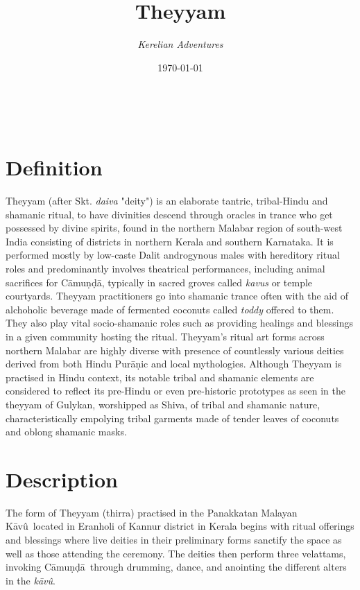 \documentclass[a4paper, 11pt]{article} %
\title{\textbf{Theyyam}} %
\author{\textit{Kerelian Adventures}} %
\date{\today} %
\makeatletter
\newcommand{\camunda}[0]{C\={a}mu\d{n}\d{d}\={a}}
\newcommand{\kavu}[0]{\textit{k\={a}v\^{u}}}
\newcommand{\Kavu}[0]{K\={a}v\^{u}}
\renewcommand{\maketitle}{ %
\begin{flushright} %
{\LARGE\@title} %

\vspace{10pt} %

{\@author} %
\\\@date %

\vspace{30pt} %
\end{flushright}
}
\makeatother
\begin{document}
\maketitle %

\thispagestyle{empty}


\section{Definition}
  \label{sec:Definition}

Theyyam (after Skt. \textit{daiva} "deity") is an elaborate tantric, tribal-Hindu and shamanic ritual, to have divinities descend through oracles in trance who get possessed by divine spirits, found in the northern Malabar region of south-west India consisting of districts in northern Kerala and southern Karnataka. It is performed mostly by low-caste Dalit androgynous males with hereditory ritual roles and predominantly involves theatrical performances, including animal sacrifices for Cāmuṇḍā, typically in sacred groves called \textit{kavus} or temple courtyards. Theyyam practitioners go into shamanic trance often with the aid of alchoholic beverage made of fermented coconuts called \textit{toddy} offered to them. They also play vital socio-shamanic roles such as providing healings and blessings in a given community hosting the ritual. Theyyam's ritual art forms across northern Malabar are highly diverse with presence of countlessly various deities derived from both Hindu Purāṇic and local mythologies. Although Theyyam is practised in Hindu context, its notable tribal and shamanic elements are considered to reflect its pre-Hindu or even pre-historic prototypes as seen in the theyyam of Gulykan, worshipped as Shiva, of tribal and shamanic nature, characteristically empolying tribal garments made of tender leaves of coconuts and oblong shamanic masks.

\section{Description}%
  \label{sec:Description}
  
The form of Theyyam (thirra) practised in the Panakkatan Malayan \Kavu\ located in Eranholi of Kannur district in Kerala begins with ritual offerings and blessings where live deities in their preliminary forms sanctify the space as well as those attending the ceremony.
The deities then perform three velattams, invoking \camunda\ through drumming, dance, and anointing the different alters in the \kavu.
\end{document}
